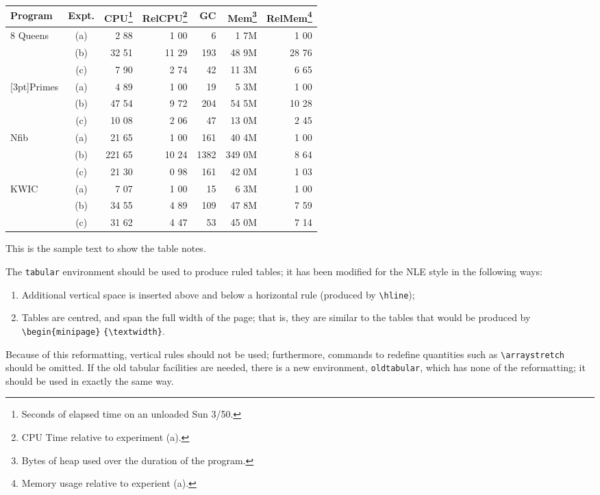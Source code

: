\documentclass{nle}
\begin{document}
\begin{table}[h!]
 {\tablefont\begin{minipage}{25pc}
    \begin{tabular}{@{\extracolsep{\fill}}lcrrrrr}
    \hline
    Program& Expt.&
     CPU\footnote{Seconds of elapsed time on an unloaded Sun 3/50.}&
     RelCPU\footnote{CPU Time relative to experiment (a).}&
     GC& Mem\footnote{Bytes of heap used over the duration of the program.}&
     RelMem\footnote{Memory usage relative to experient (a).}\\
    \hline
    8 Queens& (a)&   2 88&  1 00&    6&   1 7M&  1 00\\\hdashline
    &         (b)&  32 51& 11 29&  193&  48 9M& 28 76\\\hdashline
    &         (c)&   7 90&  2 74&   42&  11 3M&  6 65\\\hdashline
    \multirow{4}{*}[3pt]{Primes}&   (a)&   4 89&  1 00&   19&   5 3M&  1 00\\\hdashline
    &         (b)&  47 54&  9 72&  204&  54 5M& 10 28\\\hdashline
    &         (c)&  10 08&  2 06&   47&  13 0M&  2 45\\\hdashline
    Nfib&     (a)&  21 65&  1 00&  161&  40 4M&  1 00\\\hdashline
    &         (b)& 221 65& 10 24& 1382& 349 0M&  8 64\\\hdashline
    &         (c)&  21 30&  0 98&  161&  42 0M&  1 03\\\hdashline
    KWIC&     (a)&   7 07&  1 00&   15&   6 3M&  1 00\\\hdashline
    &         (b)&  34 55&  4 89&  109&  47 8M&  7 59\\\hdashline
    &         (c)&  31 62&  4 47&   53&  45 0M&  7 14\\
    \hline
    \end{tabular}
  \end{minipage}}
  {\begin{tabnote}
  This is the sample text to show the table notes.
  \end{tabnote}}
  \label{sample-table}
\end{table}

The \verb"tabular" environment should be used to produce ruled tables;
it has been modified for the NLE style in the following ways:
\begin{enumerate}
  \item Additional vertical space is inserted above and below a horizontal rule
        (produced by \verb"\hline");
  \item Tables are centred, and span the full width of the page; that is,
  they are similar to the tables that would be produced by
  \verb"\begin{minipage}" \verb"{\textwidth}".
\end{enumerate}
Because of this reformatting, vertical rules should not be used;
furthermore, commands to
redefine quantities such as \verb"\arraystretch" should be omitted. If
the old tabular facilities are needed, there is a new environment,
\verb"oldtabular", which has none of the reformatting; it should be used
in exactly the same way.
\end{document}
